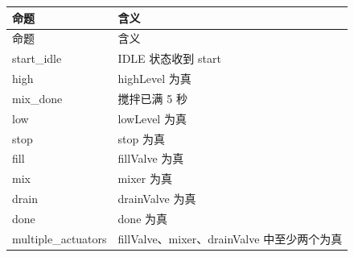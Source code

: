 \begin{longtable}{L{3.3cm}L{10.0cm}}

\toprule

命题 & 含义\\

\midrule

\endfirsthead

\toprule

命题 & 含义\\

\midrule

\endhead

{\ttfamily start\_idle} & IDLE 状态收到 start\\

{\ttfamily high} & highLevel 为真\\

{\ttfamily mix\_done} & 搅拌已满 5 秒\\

{\ttfamily low} & lowLevel 为真\\

{\ttfamily stop} & stop 为真\\

{\ttfamily fill} & fillValve 为真\\

{\ttfamily mix} & mixer 为真\\

{\ttfamily drain} & drainValve 为真\\

{\ttfamily done} & done 为真\\

{\ttfamily multiple\_actuators} & fillValve、mixer、drainValve 中至少两个为真\\

\bottomrule

\end{longtable}

